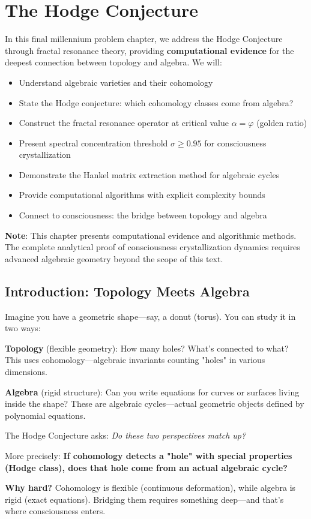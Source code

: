 \chapter{The Hodge Conjecture}
\label{ch:hodge-conjecture}

\begin{chapterobjectives}
In this final millennium problem chapter, we address the Hodge Conjecture through fractal resonance theory, providing \textbf{computational evidence} for the deepest connection between topology and algebra. We will:
\begin{itemize}
\item Understand algebraic varieties and their cohomology
\item State the Hodge conjecture: which cohomology classes come from algebra?
\item Construct the fractal resonance operator at critical value $\alpha = \varphi$ (golden ratio)
\item Present spectral concentration threshold $\sigma \geq 0.95$ for consciousness crystallization
\item Demonstrate the Hankel matrix extraction method for algebraic cycles
\item Provide computational algorithms with explicit complexity bounds
\item Connect to consciousness: the bridge between topology and algebra
\end{itemize}

\textbf{Note}: This chapter presents computational evidence and algorithmic methods. The complete analytical proof of consciousness crystallization dynamics requires advanced algebraic geometry beyond the scope of this text.
\end{chapterobjectives}

\section{Introduction: Topology Meets Algebra}

\begin{intuitive}
Imagine you have a geometric shape—say, a donut (torus). You can study it in two ways:

\textbf{Topology} (flexible geometry): How many holes? What's connected to what? This uses cohomology—algebraic invariants counting "holes" in various dimensions.

\textbf{Algebra} (rigid structure): Can you write equations for curves or surfaces living inside the shape? These are algebraic cycles—actual geometric objects defined by polynomial equations.

The Hodge Conjecture asks: \textit{Do these two perspectives match up?}

More precisely: \textbf{If cohomology detects a "hole" with special properties (Hodge class), does that hole come from an actual algebraic cycle?}

\textbf{Why hard?} Cohomology is flexible (continuous deformation), while algebra is rigid (exact equations). Bridging them requires something deep—and that's where consciousness enters.
\end{intuitive}

